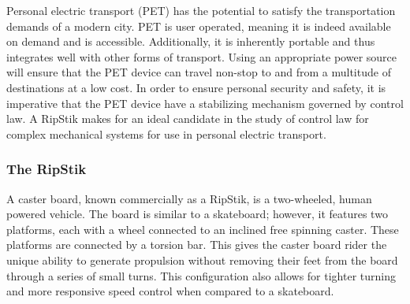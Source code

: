 Personal electric transport (PET) has the potential to satisfy the transportation demands of a modern city. 
PET is user operated, meaning it is indeed available on demand and is accessible. 
Additionally, it is inherently portable and thus integrates well with other forms of transport. 
Using an appropriate power source will ensure that the PET device can travel non-stop to and from a multitude of destinations at a low cost. 
In order to ensure personal security and safety, it is imperative that the PET device have a stabilizing mechanism governed by control law. 
A RipStik makes for an ideal candidate in the study of control law for complex mechanical systems for use in personal electric transport. 


\subsubsection{The RipStik}

A caster board, known commercially as a RipStik, is a two-wheeled, human powered vehicle. 
The board is similar to a skateboard; however, it features two platforms, each with a wheel connected to an inclined free spinning caster. 
These platforms are connected by a torsion bar. 
This gives the caster board rider the unique ability to generate propulsion without removing their feet from the board through a series of small turns. 
This configuration also allows for tighter turning and more responsive speed control when compared to a skateboard. 

